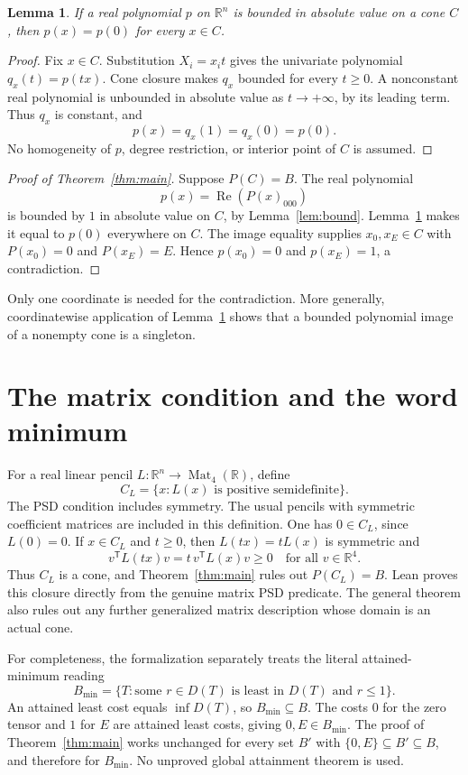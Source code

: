 \documentclass[11pt]{article}
\newtheorem{lemma}[theorem]{Lemma}
\newcommand{\R}{\mathbb R}
\begin{document}
\begin{lemma}\label{lem:ray}
If a real polynomial \(p\) on \(\R^n\) is bounded in absolute value on a
cone \(C\), then \(p(x)=p(0)\) for every \(x\in C\).
\end{lemma}
\begin{proof}
Fix \(x\in C\). Substitution \(X_i=x_i t\) gives the univariate polynomial
\(q_x(t)=p(tx)\). Cone closure makes \(q_x\) bounded for every \(t\geq0\).
A nonconstant real polynomial is unbounded in absolute value as
\(t\to+\infty\), by its leading term. Thus \(q_x\) is constant, and
\[
 p(x)=q_x(1)=q_x(0)=p(0).
\]
No homogeneity of \(p\), degree restriction, or interior point of \(C\)
is assumed.
\end{proof}

\begin{proof}[Proof of Theorem~\ref{thm:main}]
Suppose \(P(C)=B\). The real polynomial
\[
 p(x)=\operatorname{Re}(P(x)_{000})
\]
is bounded by \(1\) in absolute value on \(C\), by Lemma~\ref{lem:bound}.
Lemma~\ref{lem:ray} makes it equal to \(p(0)\) everywhere on \(C\).
The image equality supplies \(x_0,x_E\in C\) with \(P(x_0)=0\)
and \(P(x_E)=E\). Hence \(p(x_0)=0\) and \(p(x_E)=1\), a contradiction.
\end{proof}

Only one coordinate is needed for the contradiction.
More generally, coordinatewise application of Lemma~\ref{lem:ray}
shows that a bounded polynomial image of a nonempty cone is a singleton.

\section{The matrix condition and the word minimum}

For a real linear pencil \(L:\R^n\to\operatorname{Mat}_4(\R)\), define
\[
 C_L=\{x:L(x)\text{ is positive semidefinite}\}.
\]
The PSD condition includes symmetry. The usual pencils with symmetric
coefficient matrices are included in this definition.
One has \(0\in C_L\), since \(L(0)=0\). If \(x\in C_L\) and \(t\geq0\),
then \(L(tx)=tL(x)\) is symmetric and
\[
 v^{\mathsf T}L(tx)v=t\,v^{\mathsf T}L(x)v\geq0
 \quad\text{for all }v\in\R^4.
\]
Thus \(C_L\) is a cone, and Theorem~\ref{thm:main} rules out \(P(C_L)=B\).
Lean proves this closure directly from the genuine matrix PSD predicate.
The general theorem also rules out any further generalized matrix
description whose domain is an actual cone.

For completeness, the formalization separately treats the literal
attained-minimum reading
\[
 B_{\min}=\{T:\text{some }r\in D(T)\text{ is least in }D(T)
                         \text{ and }r\leq1\}.
\]
An attained least cost equals \(\inf D(T)\), so \(B_{\min}\subseteq B\).
The costs \(0\) for the zero tensor and \(1\) for \(E\) are attained
least costs, giving \(0,E\in B_{\min}\).
The proof of Theorem~\ref{thm:main} works unchanged for every set
\(B'\) with \(\{0,E\}\subseteq B'\subseteq B\), and therefore for
\(B_{\min}\). No unproved global attainment theorem is used.
\end{document}
